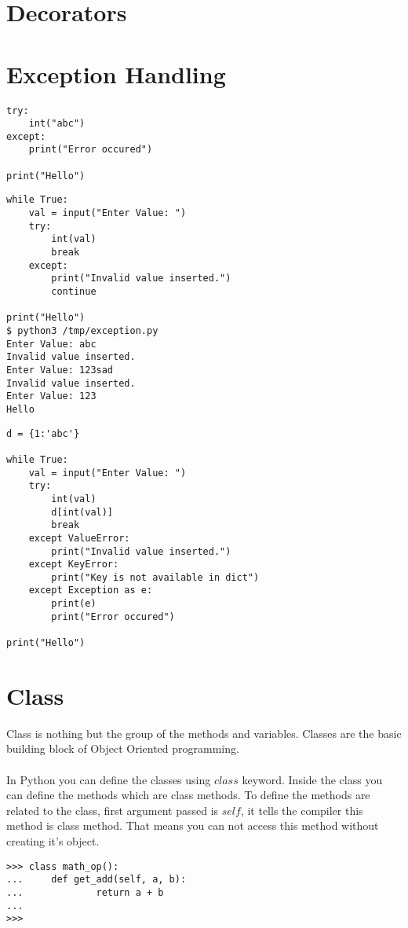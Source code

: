 \documentclass[letterpaper,12pt]{book}
\begin{document}
\section{Decorators}

\section{Exception Handling}
\begin{lstlisting}
try:
    int("abc")
except:
    print("Error occured")

print("Hello")

\end{lstlisting}
\begin{lstlisting}
while True:
    val = input("Enter Value: ")
    try:
        int(val)
        break
    except:
        print("Invalid value inserted.")
        continue

print("Hello")
$ python3 /tmp/exception.py
Enter Value: abc
Invalid value inserted.
Enter Value: 123sad
Invalid value inserted.
Enter Value: 123
Hello
\end{lstlisting}
\begin{lstlisting}
d = {1:'abc'}

while True:
    val = input("Enter Value: ")
    try:
        int(val)
        d[int(val)]
        break
    except ValueError:
        print("Invalid value inserted.")
    except KeyError:
        print("Key is not available in dict")
    except Exception as e:
        print(e)
        print("Error occured")

print("Hello")
\end{lstlisting}
\section{Class}
Class is nothing but the group of the methods and variables. Classes are the basic building block of Object Oriented programming. 
\paragraph{}
In Python you can define the classes using $class$ keyword. Inside the class you can define the methods which are class methods. To define the methods are related to the class, first argument passed is $self$, it tells the compiler this method is class method. That means you can not access this method without creating it's object. 

\begin{lstlisting}
>>> class math_op():
...     def get_add(self, a, b):
...             return a + b
... 
>>> 
\end{lstlisting}
\end{document}
